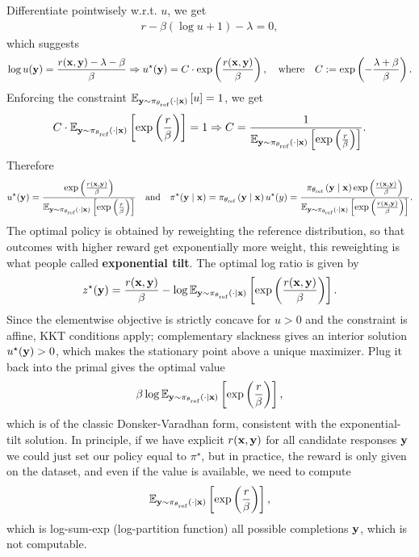 \documentclass[11pt]{article}  %
\begin{document}
Differentiate pointwisely w.r.t. $u$, we get 
\begin{align*}
  r - \beta(\log u + 1) - \lambda = 0,
\end{align*}
which suggests 
\begin{align*}
  \log u(\mathbf{y}) = \frac{r(\mathbf{x}, \mathbf{y}) - \lambda - \beta}{\beta} \Rightarrow u^\star(\mathbf{y}) = C\cdot \exp\left( \frac{r(\mathbf{x}, \mathbf{y})}{\beta} \right), \quad \text{where} \quad C := \exp\left( -\frac{\lambda + \beta}{\beta} \right).
\end{align*}
Enforcing the constraint $\mathbb{E}_{\mathbf{y} \sim \pi_{\theta_{\text{ref}}}\left( \cdot \mid \mathbf{x} \right)}\left[u\right] = 1$, we get 
\begin{align*}
  C\cdot\mathbb{E}_{\mathbf{y} \sim \pi_{\theta_{\text{ref}}}\left( \cdot \mid \mathbf{x} \right)}\left[\exp\left( \frac{r}{\beta} \right)\right] = 1 \Rightarrow C = \frac{1}{\mathbb{E}_{\mathbf{y} \sim \pi_{\theta_{\text{ref}}}\left( \cdot \mid \mathbf{x} \right)}\left[\exp\left( \frac{r}{\beta} \right)\right]}.
\end{align*}
Therefore 
\begin{align*}
  u^\star(\mathbf{y}) = \frac{\exp\left( \frac{r(\mathbf{x}, \mathbf{y})}{\beta} \right)}{\mathbb{E}_{\mathbf{y} \sim \pi_{\theta_{\text{ref}}}\left( \cdot \mid \mathbf{x} \right)}\left[\exp\left( \frac{r}{\beta} \right)\right]} \quad \text{and} \quad \pi^\star(\mathbf{y} \mid \mathbf{x}) = \pi_{\theta_{\text{ref}}}\left( \mathbf{y} \mid \mathbf{x} \right)u^\star(y) = \frac{\pi_{\theta_{\text{ref}}}\left( \mathbf{y} \mid \mathbf{x} \right)\exp\left( \frac{r(\mathbf{x}, \mathbf{y})}{\beta} \right)}{\mathbb{E}_{\mathbf{y} \sim \pi_{\theta_{\text{ref}}}\left( \cdot \mid \mathbf{x} \right)}\left[\exp\left( \frac{r(\mathbf{x},\mathbf{y})}{\beta} \right)\right]}.
\end{align*}
The optimal policy is obtained by reweighting the reference distribution, so that outcomes with higher reward get exponentially more weight, this reweighting is what people called \textbf{exponential tilt}.
The optimal log ratio is given by 
\begin{align*}
  z^\star(\mathbf{y}) = \frac{r(\mathbf{x}, \mathbf{y})}{\beta} - \log \mathbb{E}_{\mathbf{y} \sim \pi_{\theta_{\text{ref}}}\left( \cdot \mid \mathbf{x} \right)}\left[\exp\left( \frac{r(\mathbf{x}, \mathbf{y})}{\beta} \right)\right].
\end{align*}
Since the elementwise objective is strictly concave for $u > 0$ and the constraint is affine, KKT conditions apply; complementary slackness gives an interior solution $u^\star(\mathbf{y}) > 0$, which makes the stationary point above a unique maximizer.
Plug it back into the primal gives the optimal value 
\begin{align*}
  \beta \log \mathbb{E}_{\mathbf{y} \sim \pi_{\theta_{\text{ref}}}\left( \cdot \mid \mathbf{x} \right)}\left[\exp\left( \frac{r}{\beta} \right)\right],
\end{align*}
which is of the classic Donsker-Varadhan form, consistent with the exponential-tilt solution.
In principle, if we have explicit $r(\mathbf{x}, \mathbf{y})$ for all candidate responses $\mathbf{y}$ we could just set our policy equal to $\pi^\star$, but in practice, the reward is only given on the dataset, and even if the value is available, we need to compute 
\begin{align*}
  \mathbb{E}_{\mathbf{y} \sim \pi_{\theta_{\text{ref}}}\left( \cdot \mid \mathbf{x} \right)}\left[\exp\left( \frac{r}{\beta} \right)\right],
\end{align*}
which is log-sum-exp (log-partition function) all possible completions $\mathbf{y}$, which is not computable.
\end{document}
